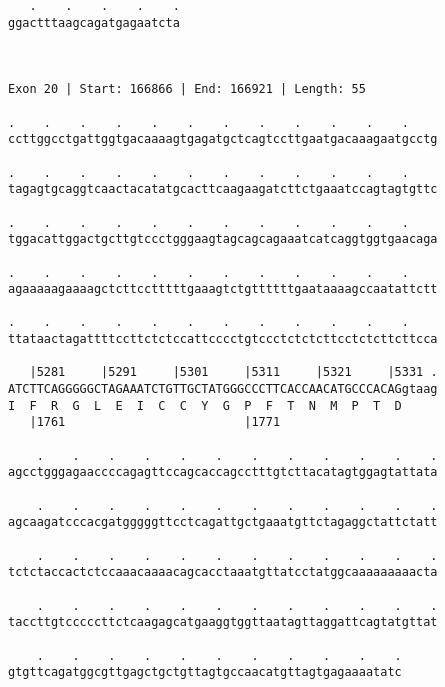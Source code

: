\documentclass{article}
\begin{document}
\begin{Verbatim}
   .    .    .    .    .
ggactttaagcagatgagaatcta
                        
                        
 
Exon 20 | Start: 166866 | End: 166921 | Length: 55
 
.    .    .    .    .    .    .    .    .    .    .    .    
ccttggcctgattggtgacaaaagtgagatgctcagtccttgaatgacaaagaatgcctg
                                                            
.    .    .    .    .    .    .    .    .    .    .    .    
tagagtgcaggtcaactacatatgcacttcaagaagatcttctgaaatccagtagtgttc
                                                            
.    .    .    .    .    .    .    .    .    .    .    .    
tggacattggactgcttgtccctgggaagtagcagcagaaatcatcaggtggtgaacaga
                                                            
.    .    .    .    .    .    .    .    .    .    .    .    
agaaaaagaaaagctcttcctttttgaaagtctgttttttgaataaaagccaatattctt
                                                            
.    .    .    .    .    .    .    .    .    .    .    .    
ttataactagattttccttctctccattcccctgtccctctctcttcctctcttcttcca
                                                            
   |5281     |5291     |5301     |5311     |5321     |5331 .
ATCTTCAGGGGGCTAGAAATCTGTTGCTATGGGCCCTTCACCAACATGCCCACAGgtaag
I  F  R  G  L  E  I  C  C  Y  G  P  F  T  N  M  P  T  D     
   |1761                         |1771                      
  
    .    .    .    .    .    .    .    .    .    .    .    .
agcctgggagaaccccagagttccagcaccagcctttgtcttacatagtggagtattata
                                                            
    .    .    .    .    .    .    .    .    .    .    .    .
agcaagatcccacgatgggggttcctcagattgctgaaatgttctagaggctattctatt
                                                            
    .    .    .    .    .    .    .    .    .    .    .    .
tctctaccactctccaaacaaaacagcacctaaatgttatcctatggcaaaaaaaaacta
                                                            
    .    .    .    .    .    .    .    .    .    .    .    .
taccttgtcccccttctcaagagcatgaaggtggttaatagttaggattcagtatgttat
                                                            
    .    .    .    .    .    .    .    .    .    .    .
gtgttcagatggcgttgagctgctgttagtgccaacatgttagtgagaaaatatc
                                                       

\end{Verbatim}
\end{document}
